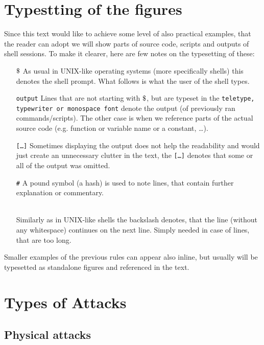 \documentclass[a4paper]{scrartcl}
\newcommand{\dollar}{\mbox{\textdollar}}
\begin{document}
\section{Typestting of the figures}

Since this text would like to achieve some level of also practical examples, that the reader can adopt we will show parts of source code, scripts and outputs of shell sessions. To make it clearer, here are few notes on the typesetting of these:
\begin{itemize}
    \item[\texttt{$\dollar$}] As usual in UNIX-like operating systems (more specifically shells) this denotes the shell prompt. What follows is what the user of the shell types.
    \item[\texttt{output}] Lines that are not starting with \texttt{$\dollar$}, but are typeset in the \texttt{teletype, typewriter or monospace font} denote the output (of previously ran commands/scripts). The other case is when we reference parts of the actual source code (e.g. function or variable name or a constant, \ldots).
    \item[\texttt{[\ldots]}] Sometimes displaying the output does not help the readability and would just create an unnecessary clutter in the text, the \texttt{[\ldots]} denotes that some or all of the output was omitted.
    \item[\texttt{\#}] A pound symbol (a hash) is used to note lines, that contain further explanation or commentary.
    \item[\texttt{\\}] Similarly as in UNIX-like shells the backslash denotes, that the line (without any whitespace) continues on the next line. Simply needed in case of lines, that are too long.
\end{itemize}

Smaller examples of the previous rules can appear also inline, but usually will be typesetted as standalone figures and referenced in the text.

\section{Types of Attacks}

\subsection{Physical attacks}
\end{document}
